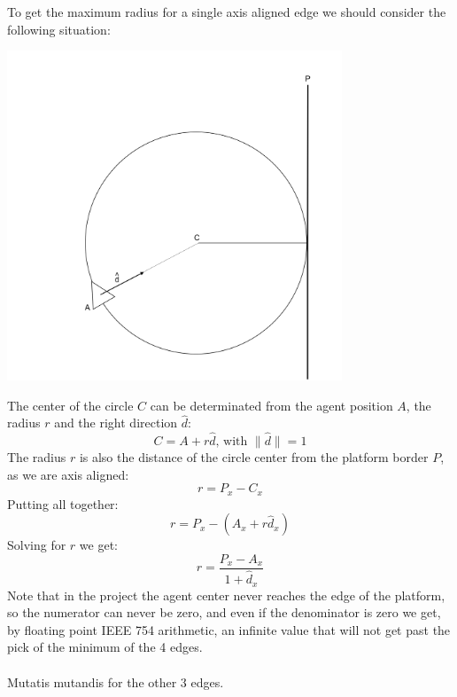 \documentclass[12pt, a4paper]{article}
\begin{document}
\clearpage
\noindent To get the maximum radius for a single axis aligned edge we should consider the following situation:
\begin{center}
    \centering
    \includegraphics[width=0.75\textwidth]{draw.png}
\end{center}
The center of the circle $C$ can be determinated from the agent position $A$, the radius $r$ and the right direction $\hat{d}$:
\[
C = A + r \hat{d}\text{, with }\|\hat{d}\|=1
\]
The radius $r$ is also the distance of the circle center from the platform border $P$, as we are axis aligned:
\[
r = P_x-C_x
\]
Putting all together:
\[
r = P_x - (A_x + r \hat{d}_x)
\]
Solving for $r$ we get:
\[
r = \dfrac{P_x-A_x}{1+\hat{d}_x}
\]
Note that in the project the agent center never reaches the edge of the platform, so the numerator can never be zero, and even if the denominator is zero we get, by floating point IEEE 754 arithmetic, an infinite value that will not get 
past the pick of the minimum of the 4 edges.\\\\
Mutatis mutandis for the other 3 edges.
\end{document}
